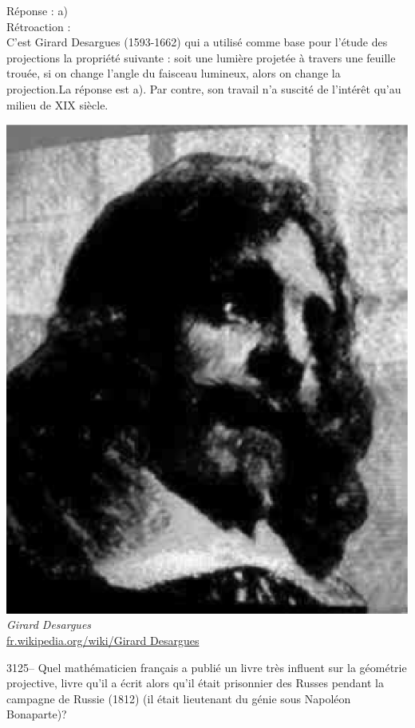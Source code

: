 \documentclass[letterpaper, 12pt]{article}
\begin{document}
R\'eponse : a)\\

R\'etroaction :\\
C'est Girard Desargues (1593-1662) qui a utilis\'e comme base pour l'\'etude des projections la propri\'et\'e suivante : \og soit une lumi\`ere projet\'ee \`a travers une feuille trou\'ee, si on change l'angle du faisceau lumineux, alors on change la projection.\fg La r\'eponse est a). Par contre, son travail n'a suscit\'e de l'int\'er\^et qu'au milieu de {\scriptsize XIX\ieme{}} si\`ecle.
\begin{center}
\includegraphics[scale=0.3]{desargues.eps}\\
\emph{{\small Girard Desargues}}\\
\href{http://fr.wikipedia.org/wiki/Girard_Desargues}{fr.wikipedia.org/wiki/Girard Desargues}\\[5mm]
\end{center}



3125-- Quel math\'ematicien fran\c cais a publi\'e un livre tr\`es influent sur la g\'eom\'etrie projective, livre qu'il a \'ecrit alors qu'il \'etait prisonnier des Russes pendant la campagne de Russie (1812) (il \'etait lieutenant du g\'enie sous Napol\'eon Bonaparte)?\\
\end{document}
